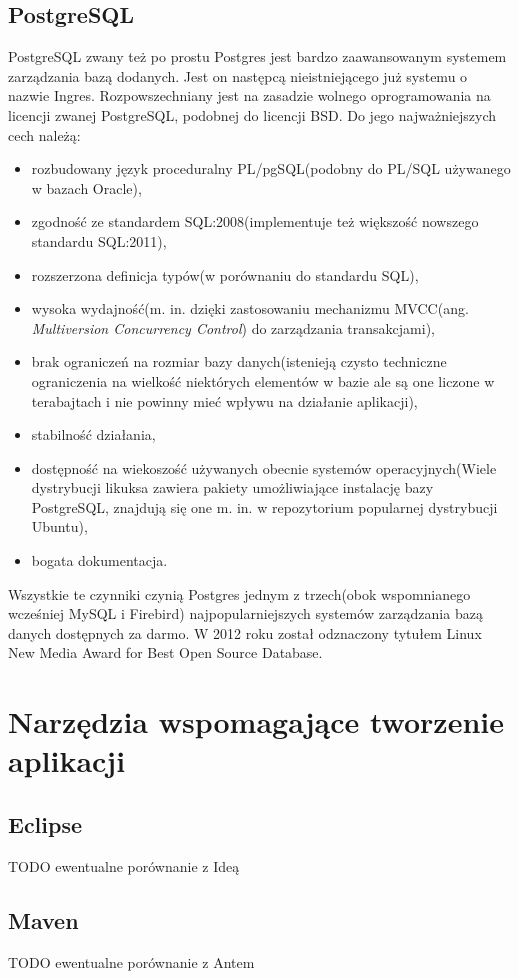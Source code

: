 \subsection[PostgreSQL][PostgreSQL]{PostgreSQL} 
PostgreSQL zwany też po prostu Postgres jest bardzo zaawansowanym systemem zarządzania bazą dodanych. Jest on następcą nieistniejącego już systemu o nazwie Ingres. Rozpowszechniany jest na zasadzie wolnego oprogramowania na licencji zwanej PostgreSQL, podobnej do licencji BSD. Do jego najważniejszych cech należą:
\begin{itemize}
	\item rozbudowany język proceduralny PL/pgSQL(podobny do PL/SQL używanego w bazach Oracle),
	\item zgodność ze standardem SQL:2008(implementuje też większość nowszego standardu SQL:2011),
	\item rozszerzona definicja typów(w porównaniu do standardu SQL),
	\item wysoka wydajność(m. in. dzięki zastosowaniu mechanizmu MVCC(ang. \textit{Multiversion Concurrency Control}) do zarządzania transakcjami),
	\item brak ograniczeń na rozmiar bazy danych(istenieją czysto techniczne ograniczenia na wielkość niektórych elementów w bazie ale są one liczone w terabajtach i nie powinny mieć wpływu na działanie aplikacji),
	\item stabilność działania,
	\item dostępność na wiekoszość używanych obecnie systemów operacyjnych(Wiele dystrybucji likuksa zawiera pakiety umożliwiające instalację bazy PostgreSQL, znajdują się one m. in. w repozytorium popularnej dystrybucji Ubuntu),
	\item bogata dokumentacja.
\end{itemize}
Wszystkie te czynniki czynią Postgres jednym z trzech(obok wspomnianego wcześniej MySQL i Firebird) najpopularniejszych systemów zarządzania bazą danych dostępnych za darmo. W 2012 roku został odznaczony tytułem Linux New Media Award for Best Open Source Database.

\section[Narzędzia wspomagające tworzenie aplikacji][Narzędzia wspomagające tworzenie aplikacji]{Narzędzia wspomagające tworzenie aplikacji}

\subsection[Eclipse][Eclipse]{Eclipse}
TODO ewentualne porównanie z Ideą

\subsection[Maven][Maven]{Maven}
TODO ewentualne porównanie z Antem
